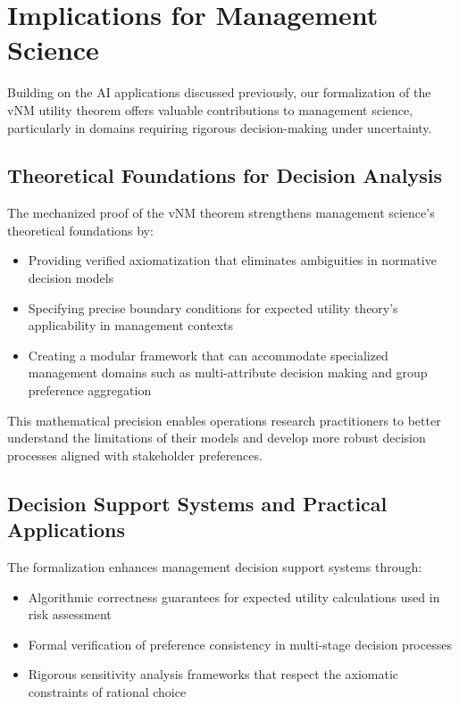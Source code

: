 \documentclass{article}
\theoremstyle{definition}
\begin{document}
\section{Implications for Management Science}\label{sec:management_science}

Building on the AI applications discussed previously, our formalization of the vNM utility theorem offers valuable contributions to management science, particularly in domains requiring rigorous decision-making under uncertainty.

\subsection{Theoretical Foundations for Decision Analysis}

The mechanized proof of the vNM theorem strengthens management science's theoretical foundations by:

\begin{itemize}
    \item Providing verified axiomatization that eliminates ambiguities in normative decision models
    \item Specifying precise boundary conditions for expected utility theory's applicability in management contexts
    \item Creating a modular framework that can accommodate specialized management domains such as multi-attribute decision making and group preference aggregation
\end{itemize}

This mathematical precision enables operations research practitioners to better understand the limitations of their models and develop more robust decision processes aligned with stakeholder preferences.

\subsection{Decision Support Systems and Practical Applications}

The formalization enhances management decision support systems through:

\begin{itemize}
    \item Algorithmic correctness guarantees for expected utility calculations used in risk assessment
    \item Formal verification of preference consistency in multi-stage decision processes
    \item Rigorous sensitivity analysis frameworks that respect the axiomatic constraints of rational choice
\end{itemize}
\end{document}
